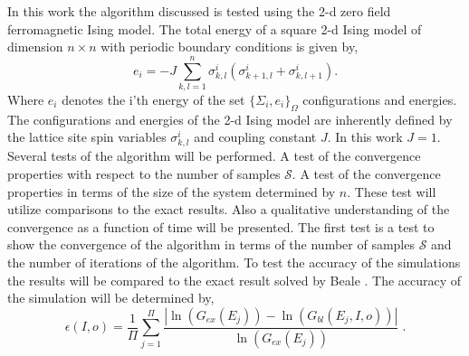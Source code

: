 \documentclass[twocolumn]{article}
\begin{document}
In this work the algorithm discussed is tested using the 2-d zero field ferromagnetic Ising model. The total energy of a square 2-d Ising model of dimension  $n\times n$ with periodic boundary conditions is given by, 
\begin{equation}
e_i = -J\sum_{k,l =1}^n \sigma^i_{k,l} 
\left( \sigma^i_{k+1,l} + \sigma^i_{k,l+1}
\right). \label{2D}
\end{equation}
Where $e_i$ denotes the i'th energy of the set  $\{\Sigma_i, e_i \}_{\Omega} $ configurations and energies. The configurations and energies of the 2-d Ising model are inherently defined by the lattice site spin variables $\sigma^i_{k,l}$ and coupling constant $J$. In this work $J=1$. Several tests of the algorithm will be performed. A test of the convergence properties with respect to the number of samples $\mathcal{S}$. A test of the convergence properties in terms of the size of the system determined by $n$. These test will utilize comparisons to the exact results. Also a qualitative understanding of the convergence as a function of time will be presented. 
The first test is a test to show the convergence of the algorithm in terms of the number of samples $\mathcal{S}$ and the number of iterations of the algorithm. To test the accuracy of the simulations the results will be compared to the exact result solved by Beale \cite{Beale_2d_ising}. The accuracy of the simulation will be determined by, 
\begin{equation}
\epsilon(I,o)  = \frac{1}{\Pi} \sum_{j=1}^{\Pi}\frac{|\ln(G_{ex}(E_j))- \ln(G_{bl}(E_j,I,o))|}{\ln(G_{ex}(E_j))}\; . 
\end{equation}
\end{document}
